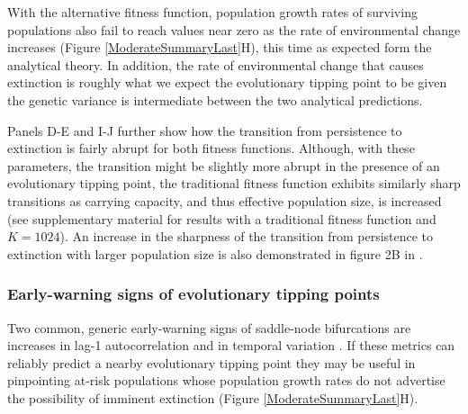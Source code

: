 \documentclass[12pt,letterpaper]{article} %
\begin{document}
With the alternative fitness function, population growth rates of surviving populations also fail to reach values near zero as the rate of environmental change increases (Figure \ref{ModerateSummaryLast}H), this time as expected form the analytical theory.
In addition, the rate of environmental change that causes extinction is roughly what we expect the evolutionary tipping point to be given the genetic variance is intermediate between the two analytical predictions.

Panels D-E and I-J further show how the transition from persistence to extinction is fairly abrupt for both fitness functions.
Although, with these parameters, the transition might be slightly more abrupt in the presence of an evolutionary tipping point, the traditional fitness function exhibits similarly sharp transitions as carrying capacity, and thus effective population size, is increased (see supplementary material for results with a traditional fitness function and $K=1024$).
An increase in the sharpness of the transition from persistence to extinction with larger population size is also demonstrated in figure 2B in \cite{Burger1995}.


\subsubsection*{Early-warning signs of evolutionary tipping points}

Two common, generic early-warning signs of saddle-node bifurcations are increases in lag-1 autocorrelation and in temporal variation \citep{Scheffer2009,Lenton2011}.
If these metrics can reliably predict a nearby evolutionary tipping point they may be useful in pinpointing at-risk populations whose population growth rates do not advertise the possibility of imminent extinction (Figure \ref{ModerateSummaryLast}H).
\end{document}
